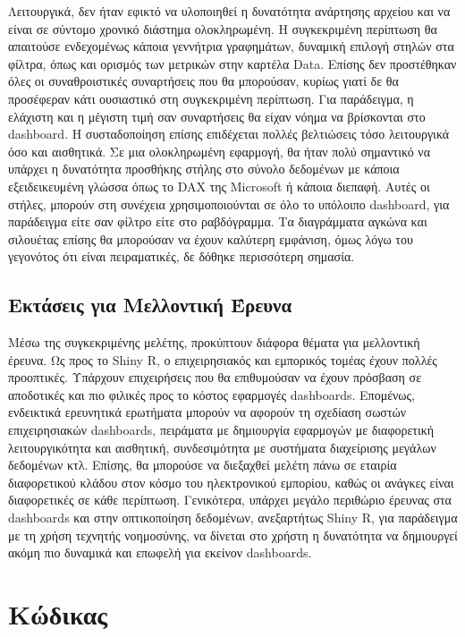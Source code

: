 \documentclass{article}
\begin{document}
Λειτουργικά, δεν ήταν εφικτό να υλοποιηθεί η δυνατότητα ανάρτησης αρχείου και να είναι σε σύντομο χρονικό διάστημα ολοκληρωμένη. Η συγκεκριμένη περίπτωση θα απαιτούσε ενδεχομένως κάποια γεννήτρια γραφημάτων, δυναμική επιλογή στηλών στα φίλτρα, όπως και ορισμός των μετρικών στην καρτέλα Data. Επίσης δεν προστέθηκαν όλες οι συναθροιστικές συναρτήσεις που θα μπορούσαν, κυρίως γιατί δε θα προσέφεραν κάτι ουσιαστικό στη συγκεκριμένη περίπτωση. Για παράδειγμα, η ελάχιστη και η μέγιστη τιμή σαν συναρτήσεις θα είχαν νόημα να βρίσκονται στο dashboard. Η συσταδοποίηση επίσης επιδέχεται πολλές βελτιώσεις τόσο λειτουργικά όσο και αισθητικά. Σε μια ολοκληρωμένη εφαρμογή, θα ήταν πολύ σημαντικό να υπάρχει η δυνατότητα προσθήκης στήλης στο σύνολο δεδομένων με κάποια εξειδεικευμένη γλώσσα όπως το DAX της Microsoft ή κάποια διεπαφή. Αυτές οι στήλες, μπορούν στη συνέχεια χρησιμοποιούνται σε όλο το υπόλοιπο dashboard, για παράδειγμα είτε σαν φίλτρο είτε στο ραβδόγραμμα. Τα διαγράμματα αγκώνα και σιλουέτας επίσης θα μπορούσαν να έχουν καλύτερη εμφάνιση, όμως λόγω του γεγονότος ότι είναι πειραματικές, δε δόθηκε περισσότερη σημασία.

\subsection{Εκτάσεις για Μελλοντική Έρευνα}

Μέσω της συγκεκριμένης μελέτης, προκύπτουν διάφορα θέματα για μελλοντική έρευνα. Ως προς το Shiny R, ο επιχειρησιακός και εμπορικός τομέας έχουν πολλές προοπτικές. Υπάρχουν επιχειρήσεις που θα επιθυμούσαν να έχουν πρόσβαση σε αποδοτικές και πιο φιλικές προς το κόστος εφαρμογές dashboards. Επομένως, ενδεικτικά ερευνητικά ερωτήματα μπορούν να αφορούν τη σχεδίαση σωστών επιχειρησιακών dashboards, πειράματα με δημιουργία εφαρμογών με διαφορετική λειτουργικότητα και αισθητική, συνδεσιμότητα με συστήματα διαχείρισης μεγάλων δεδομένων κτλ. Επίσης, θα μπορούσε να διεξαχθεί μελέτη πάνω σε εταιρία διαφορετικού κλάδου στον κόσμο του ηλεκτρονικού εμπορίου, καθώς οι ανάγκες είναι διαφορετικές σε κάθε περίπτωση. Γενικότερα, υπάρχει μεγάλο περιθώριο έρευνας στα dashboards και στην οπτικοποίηση δεδομένων, ανεξαρτήτως Shiny R, για παράδειγμα με τη χρήση τεχνητής νοημοσύνης, να δίνεται στο χρήστη η δυνατότητα να δημιουργεί ακόμη πιο δυναμικά και επωφελή για εκείνον dashboards.

\newpage




\newpage

\appendix
\section{Κώδικας}

\end{document}
